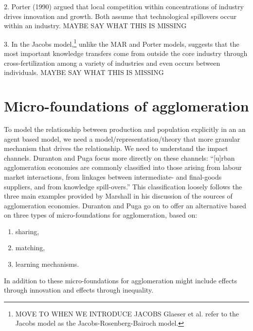 2. Porter (1990) argued that local competition within concentrations of industry drives innovation and growth. Both assume that technological spillovers occur within an industry. MAYBE SAY WHAT THIS IS MISSING

3. In the Jacobs model,\footnote{MOVE TO WHEN WE INTRODUCE JACOBS Glaeser et al. \cite{glaeserGrowthCities1991} refer to the Jacobs model as the Jacobs-Rosenberg\cite{rosenbergTechnologicalChangeMachine1963}-Bairoch \cite{bairochCitiesEconomicDevelopment1988} model.} unlike the MAR and Porter models, suggests that the most important knowledge transfers come from outside the core industry through cross-fertilization among a variety  of  industries and even occurs between individuals.  MAYBE SAY WHAT THIS IS MISSING




\section{Micro-foundations of agglomeration}
To model the relationship between production and population explicitly in an an agent based model, we need a model/representation/theory that more granular mechanism that drives the relationship. We need to understand the impact channels. 
Duranton and Puga \cite{durantonMicroFoundationsUrbanAgglomeration2004} focus more directly on these channels: ``[u]rban agglomeration economies are commonly classified into those arising from labour market interactions, from linkages between intermediate- and final-goods suppliers, and from knowledge spill-overs.'' This classification loosely follows the three main examples provided by Marshall \cite{marshallPrinciplesEconomics1890} in his discussion of the sources of agglomeration economies.  Duranton and Puga go on to offer an alternative based on three types of micro-foundations for agglomeration, based on:
\begin{enumerate}
\item sharing,
\item  matching, 
\item  learning mechanisms.
\end{enumerate}
In addition to these micro-foundations for agglomeration might include effects through innovation and effects through inequality.
 
